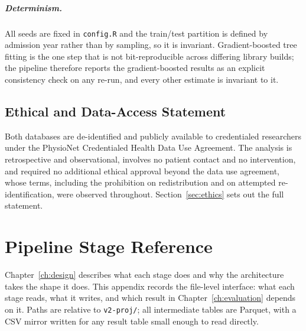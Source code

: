 \paragraph{Determinism.} All seeds are fixed in \texttt{config.R} and the
train/test partition is defined by admission year rather than by sampling, so
it is invariant. Gradient-boosted tree fitting is the one step that is not
bit-reproducible across differing library builds; the pipeline therefore
reports the gradient-boosted results as an explicit consistency check on any
re-run, and every other estimate is invariant to it.

\section{Ethical and Data-Access Statement}

Both databases are de-identified and publicly available to credentialed
researchers under the PhysioNet Credentialed Health Data Use Agreement. The
analysis is retrospective and observational, involves no patient contact and no
intervention, and required no additional ethical approval beyond the data use
agreement, whose terms, including the prohibition on redistribution and on
attempted re-identification, were observed throughout.
Section~\ref{sec:ethics} sets out the full statement.


\chapter{Pipeline Stage Reference}
\label{app:stages}

Chapter~\ref{ch:design} describes what each stage does and why the architecture
takes the shape it does. This appendix records the file-level interface: what
each stage reads, what it writes, and which result in Chapter~\ref{ch:evaluation}
depends on it. Paths are relative to \texttt{v2-proj/}; all intermediate tables
are Parquet, with a CSV mirror written for any result table small enough to read
directly.

